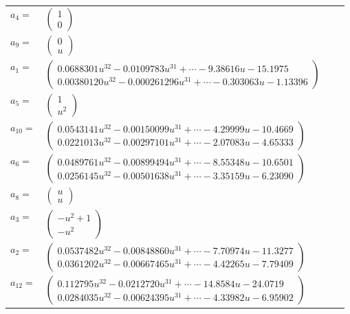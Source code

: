 \documentclass[1p]{elsarticle_modified}
\theoremstyle{definition}
\begin{document}
\begin{tabular}{m{7pt} m{180pt} m{7pt} m{180pt} }
\flushright $a_{4}=$&$\begin{pmatrix}1\\0\end{pmatrix}$ \\
\flushright $a_{9}=$&$\begin{pmatrix}0\\u\end{pmatrix}$ \\
\flushright $a_{1}=$&$\begin{pmatrix}0.0688301 u^{32}-0.0109783 u^{31}+\cdots-9.38616 u-15.1975\\0.00380120 u^{32}-0.000261296 u^{31}+\cdots-0.303063 u-1.13396\end{pmatrix}$ \\
\flushright $a_{5}=$&$\begin{pmatrix}1\\u^2\end{pmatrix}$ \\
\flushright $a_{10}=$&$\begin{pmatrix}0.0543141 u^{32}-0.00150099 u^{31}+\cdots-4.29999 u-10.4669\\0.0221013 u^{32}-0.00297101 u^{31}+\cdots-2.07083 u-4.65333\end{pmatrix}$ \\
\flushright $a_{6}=$&$\begin{pmatrix}0.0489761 u^{32}-0.00899494 u^{31}+\cdots-8.55348 u-10.6501\\0.0256145 u^{32}-0.00501638 u^{31}+\cdots-3.35159 u-6.23090\end{pmatrix}$ \\
\flushright $a_{8}=$&$\begin{pmatrix}u\\u\end{pmatrix}$ \\
\flushright $a_{3}=$&$\begin{pmatrix}- u^2+1\\- u^2\end{pmatrix}$ \\
\flushright $a_{2}=$&$\begin{pmatrix}0.0537482 u^{32}-0.00848860 u^{31}+\cdots-7.70974 u-11.3277\\0.0361202 u^{32}-0.00667465 u^{31}+\cdots-4.42265 u-7.79409\end{pmatrix}$ \\
\flushright $a_{12}=$&$\begin{pmatrix}0.112795 u^{32}-0.0212720 u^{31}+\cdots-14.8584 u-24.0719\\0.0284035 u^{32}-0.00624395 u^{31}+\cdots-4.33982 u-6.95902\end{pmatrix}$ \\

\end{tabular}
\end{document}
